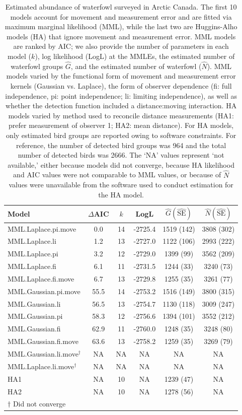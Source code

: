 \documentclass[aoas,preprint]{imsart}
\numberwithin{equation}{section}
\theoremstyle{plain}
\begin{document}
\begin{table}[ht]
\caption{Estimated abundance of waterfowl surveyed in Arctic Canada.  The first 10 models account for movement and measurement error and are fitted via maximum marginal likelihood (MML), while the last two are Huggins-Alho models (HA) that ignore movement and measurement error.  MML models are ranked by AIC; we also provide the number of parameters in each model ($k$), log likelihood (LogL) at the MMLEs, the estimated number of waterfowl groups $\hat{G}$, and the estimated number of waterfowl ($\hat{N}$).  MML models varied by the functional form of movement and measurement error kernels (Gaussian vs. Laplace), the form of observer dependence (fi: full independence, pi: point independence; li: limiting independence),  as well as whether the detection function included a distance:moving interaction.  HA models varied by method used to reconcile distance measurements (HA1: prefer measurement of observer 1; HA2: mean distance). For HA models, only estimated bird groups are reported owing to software constraints. For reference, the number of detected bird groups was 964 and the total number of detected birds was 2666.  The `NA' values represent `not available,' either because models did not converge, because HA likelihood and AIC values were not comparable to MML values, or because of $\hat{N}$ values were unavailable from the software used to conduct estimation for the HA model.
}
\label{tab:ests}
\raggedright
\begin{tabular}{lccccc}
  \hline
  Model & $\Delta$AIC & $k$ & LogL & $\hat{G}(\hat{\textrm{SE}})$ & $\hat{N}(\hat{\textrm{SE}})$  \\
  \hline
  MML.Laplace.pi.move & 0.0 & 14 & -2725.4 & 1519 (142) & 3808 (302) \\
  MML.Laplace.li & 1.2 & 13 & -2727.0 & 1122 (106) & 2993 (222) \\
  MML.Laplace.pi & 3.2 & 12 & -2729.0 & 1399 (99) & 3562 (209) \\
  MML.Laplace.fi & 6.1 & 11 & -2731.5 & 1244 (33) & 3240 (73) \\
  MML.Laplace.fi.move & 6.7 & 13 & -2729.8 & 1255 (35) & 3261 (77) \\
  MML.Gaussian.pi.move & 55.5 & 14 & -2753.2 & 1516 (149) & 3800 (315) \\
  MML.Gaussian.li & 56.5 & 13 & -2754.7 & 1130 (118) & 3009 (247) \\
  MML.Gaussian.pi & 58.3 & 12 & -2756.6 & 1394 (101) & 3552 (212) \\
  MML.Gaussian.fi & 62.9 & 11 & -2760.0 & 1248 (35) & 3248 (80) \\
  MML.Gaussian.fi.move & 63.6 & 13 & -2758.2 & 1259 (35) & 3269 (79) \\
  MML.Gaussian.li.move$^\dag$ & NA & NA & NA & NA & NA \\
  MML.Laplace.li.move$^\dag$ & NA & NA & NA & NA & NA \\
  HA1 & NA & 10 & NA & 1239 (47) & NA \\
  HA2 & NA & 10 & NA & 1278 (56) & NA \\
\hline
$\dag$ Did not converge & & & & & \\
\end{tabular}
\end{table}
\end{document}
